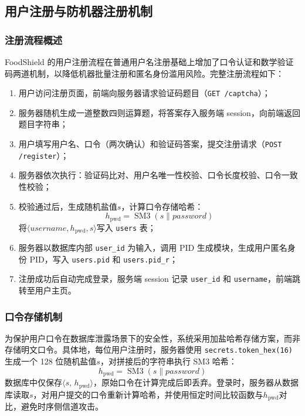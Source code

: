 \subsection{用户注册与防机器注册机制}

\subsubsection*{注册流程概述}

FoodShield 的用户注册流程在普通用户名注册基础上增加了口令认证和数学验证码两道机制，以降低机器批量注册和匿名身份滥用风险。完整注册流程如下：



\begin{enumerate}[label=\arabic*., leftmargin=2em]
  \item 用户访问注册页面，前端向服务器请求验证码题目（\texttt{GET /captcha}）；
  \item 服务器随机生成一道整数四则运算题，将答案存入服务端 session，向前端返回题目字符串；
  \item 用户填写用户名、口令（两次确认）和验证码答案，提交注册请求（\texttt{POST /register}）；
  \item 服务器依次执行：验证码比对、用户名唯一性校验、口令长度校验、口令一致性校验；
  \item 校验通过后，生成随机盐值$s$，计算口令存储哈希：
    \[
      h_{\mathrm{pwd}} = \operatorname{SM3}(s \| \mathit{password})
    \]
    将$\langle\mathit{username}, h_{\mathrm{pwd}}, s\rangle$写入 \texttt{users} 表；
  \item 服务器以数据库内部 \texttt{user\_id} 为输入，调用 PID 生成模块，生成用户匿名身份 PID，写入 \texttt{users.pid} 和 \texttt{users.pid\_r}；
  \item 注册成功后自动完成登录，服务端 session 记录 \texttt{user\_id} 和 \texttt{username}，前端跳转至用户主页。
\end{enumerate}

\subsubsection*{口令存储机制}

为保护用户口令在数据库泄露场景下的安全性，系统采用加盐哈希存储方案，而非存储明文口令。具体地，每位用户注册时，服务器使用 \texttt{secrets.token\_hex(16)} 生成一个 128 位随机盐值$s$，对拼接后的字符串执行 SM3 哈希：
\[
  h_{\mathrm{pwd}} = \operatorname{SM3}(s \| \mathit{password})
\]
数据库中仅保存$\langle s,\, h_{\mathrm{pwd}}\rangle$，原始口令在计算完成后即丢弃。登录时，服务器从数据库读取$s$，对用户提交的口令重新计算哈希，并使用恒定时间比较函数与$h_{\mathrm{pwd}}$对比，避免时序侧信道攻击。

